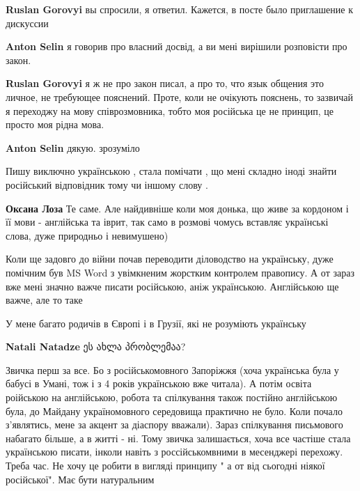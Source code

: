 \begin{itemize}
\begin{itemize}
\textbf{Ruslan Gorovyi} вы спросили, я ответил. Кажется, в посте было приглашение к дискуссии

\textbf{Anton Selin} я говорив про власний досвід, а ви мені вирішили розповісти про закон.

\textbf{Ruslan Gorovyi} я ж не про закон писал, а про то, что язык общения это личное, не требующее пояснений.
Проте, коли не очікують пояснень, то зазвичай я переходжу на мову співрозмовника, тобто моя російська це не принцип, це просто моя рідна мова.

\textbf{Anton Selin} дякую. зрозуміло
\end{itemize} %


Пишу виключно українською , стала помічати , що мені складно іноді знайти
російський відповідник тому чи іншому слову .

\begin{itemize} %
\textbf{Оксана Лоза} Те саме. Але найдивніше коли моя донька, що живе за кордоном і її мови - англійська та іврит, так само в розмові чомусь вставляє українські слова, дуже природньо і невимушено)
\end{itemize} %


Коли ще задовго до війни почав переводити діловодство на українську, дуже
помічним був MS Word з увімкненим жорстким контролем правопису. А от зараз вже
мені значно важче писати російською, аніж українською. Англійською ще важче,
але то таке


У мене багато родичів в Європі і в Грузії, які не розуміють українську

\begin{itemize} %
\textbf{Natali Natadze} ეს ახლა პრობლემაა?
\end{itemize} %


Звичка перш за все. Бо з російськомовного Запоріжжя (хоча українська була у
бабусі в Умані, тож і з 4 років українською вже читала). А потім освіта
роійською на англійською, робота та спілкування також постійно англійською
була, до Майдану україномовного середовища практично не було. Коли почало
з'являтись, мене за акцент за діаспору вважали). Зараз спілкування письмового
набагато більше, а в житті - ні. Тому звичка залишається, хоча все частіше
стала українською писати, інколи навіть з россійськомвними в месенджері
перехожу. Треба час. Не хочу це робити в вигляді принципу " а от від сьогодні
ніякої російської". Має бути натуральним


\end{itemize}
